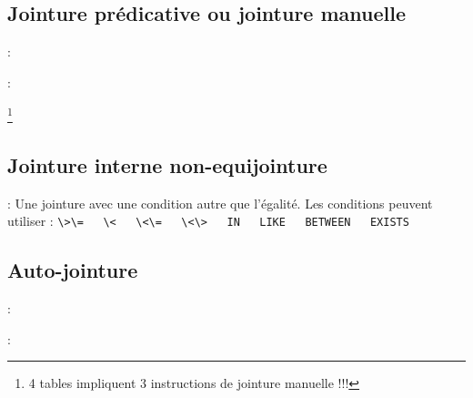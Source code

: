 \documentclass[10pt]{beamer}
\begin{document}
\subsection{Jointure prédicative ou jointure manuelle}

\begin{frame}{\secname : \subsecname}
    
\end{frame}

\begin{frame}{\secname : \subsecname}
    
    \footnote{4 tables impliquent 3 instructions de jointure manuelle !!!}
\end{frame}

\subsection{Jointure interne non-equijointure}
\begin{frame}{\secname : \subsecname}
    Une jointure avec une condition autre que l'égalité.
    Les conditions peuvent utiliser :
    \lstinline[language=plsql]!\>\=   \<   \<\=   \<\>   IN   LIKE   BETWEEN   EXISTS!
    
\end{frame}

\subsection{Auto-jointure}
\begin{frame}{\secname : \subsecname}
    
\end{frame}


\begin{frame}{\secname : \subsecname}
    
\end{frame}
\end{document}
